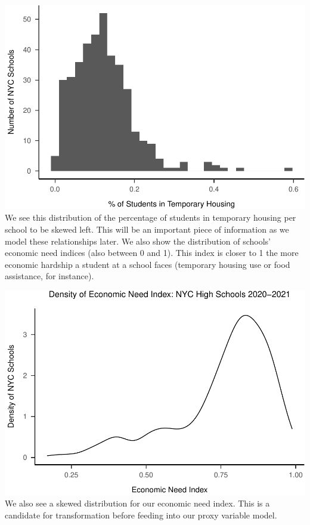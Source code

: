 \documentclass[
  man]{apa6}
\begin{document}
\includegraphics{final-project_files/figure-latex/temp-housing-rates-1.pdf}
We see this distribution of the percentage of students in temporary housing per school to be skewed left. This will be an important piece of information as we model these relationships later. We also show the distribution of schools' economic need indices (also between 0 and 1). This index is closer to 1 the more economic hardship a student at a school faces (temporary housing use or food assistance, for instance).

\includegraphics{final-project_files/figure-latex/economic-need-index-1.pdf}
We also see a skewed distribution for our economic need index. This is a candidate for transformation before feeding into our proxy variable model.
\end{document}
